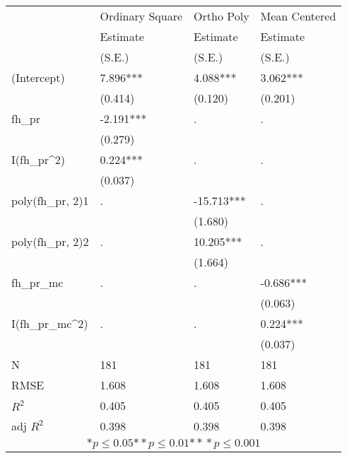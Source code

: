 \begin{tabular}{*{4}{l}}
\hline
                  & Ordinary Square & Ortho Poly & Mean Centered   \tabularnewline
                   &Estimate   &Estimate   &Estimate \tabularnewline
                 &(S.E.)   &(S.E.)   &(S.E.) \tabularnewline
 \hline
 \hline
   (Intercept)     &7.896*** &4.088*** &3.062*** \tabularnewline
                 &(0.414)   &(0.120)   &(0.201)  \tabularnewline
   fh_pr           &-2.191***   & .        & .      \tabularnewline
                 &(0.279)   &         &        \tabularnewline
   I(fh_pr^2)      &0.224***   & .        & .      \tabularnewline
                 &(0.037)   &         &        \tabularnewline
   poly(fh_pr, 2)1      & .      &-15.713***   & .      \tabularnewline
                 &         &(1.680)   &        \tabularnewline
   poly(fh_pr, 2)2      & .      &10.205***   & .      \tabularnewline
                 &         &(1.664)   &        \tabularnewline
   fh_pr_mc          & .        & .      &-0.686*** \tabularnewline
                 &         &         &(0.063)  \tabularnewline
   I(fh_pr_mc^2)      & .        & .      &0.224*** \tabularnewline
                 &         &         &(0.037)  \tabularnewline
 \hline
 N                 &181       &181       &181       \tabularnewline
 RMSE             &1.608   &1.608   &1.608   \tabularnewline
 $R^2$             &0.405   &0.405   &0.405   \tabularnewline
 adj $R^2$         &0.398   &0.398   &0.398   \tabularnewline
 \hline
\hline
 
 \multicolumn{4}{c}{${*  p}\le 0.05$${*\!\!*  p}\le 0.01$${*\!\!*\!\!*  p}\le 0.001$}\tabularnewline
 \end{tabular}